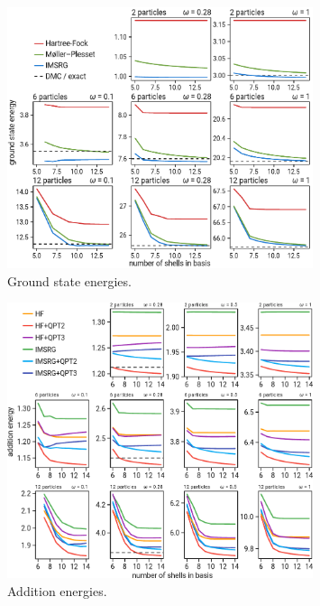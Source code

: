 \begin{figure}
  \centering
  \includegraphics[width=0.8\textwidth]{fig-gs}
  \caption{Ground state energies.}
  \label{fig:gs}
\end{figure}

\begin{figure}
  \centering
  \includegraphics[width=0.8\textwidth]{fig-add}
  \caption{Addition energies.}
  \label{fig:add}
\end{figure}

